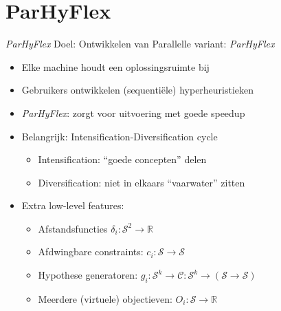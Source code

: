 \documentclass[handout]{beamer}
\newcommand{\sol}{\mathcal{S}}
\newcommand{\constr}{\mathcal{C}}
\newcommand{\RR}{\mathbb{R}}
\begin{document}
\section{ParHyFlex}
\begin{frame}{\emph{ParHyFlex}}
Doel: Ontwikkelen van Parallelle variant: \emph{ParHyFlex}
\begin{itemize}[<+->]
 \item Elke machine houdt een oplossingsruimte bij
 \item Gebruikers ontwikkelen (sequenti\"ele) hyperheuristieken
 \item \emph{ParHyFlex}: zorgt voor uitvoering met goede speedup
 \item Belangrijk: Intensification-Diversification cycle
 \begin{itemize}[<+->]
  \item Intensification: ``goede concepten'' delen
  \item Diversification: niet in elkaars ``vaarwater'' zitten
 \end{itemize}
 \item Extra low-level features:
 \begin{itemize}[<+->]
  \item Afstandsfuncties $\delta_i:\sol^2\rightarrow\RR$
  \item Afdwingbare constraints: $c_i:\sol\rightarrow\sol$
  \item Hypothese generatoren: $g_i:\sol^k\rightarrow\constr:\sol^k\rightarrow\left(\sol\rightarrow\sol\right)$
  \item Meerdere (virtuele) objectieven: $O_i:\sol\rightarrow\RR$
 \end{itemize}
\end{itemize}
\end{frame}
\end{document}
